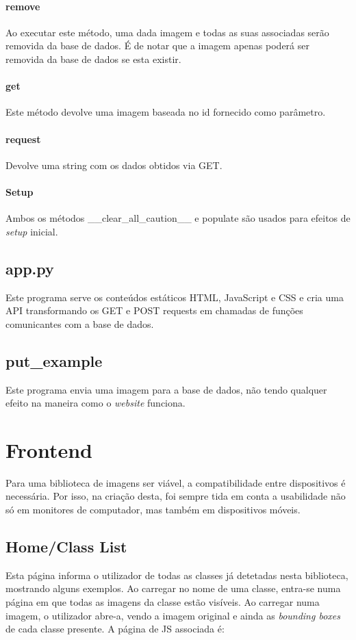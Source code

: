 \documentclass{report}
\begin{document}
\paragraph{remove}
Ao executar este método, uma dada imagem e todas as suas associadas serão removida da base de dados. É de notar que a imagem apenas poderá ser removida da base de dados se esta existir.

\paragraph{get}
Este método devolve uma imagem baseada no id fornecido como parâmetro. 

\paragraph{request}
Devolve uma string com os dados obtidos via GET.

\paragraph{Setup}
Ambos os métodos \_\_clear\_all\_caution\_\_ e  populate são usados para efeitos de \textit{setup} inicial.

\subsection{app.py}
Este programa serve os conteúdos estáticos HTML, JavaScript e CSS e cria uma API transformando os GET e POST requests em chamadas de funções comunicantes com a base de dados. 

\subsection{put\_example}
Este programa envia uma imagem para a base de dados, não tendo qualquer efeito na maneira como o \textit{website} funciona.

\section{Frontend}
Para uma biblioteca de imagens ser viável, a compatibilidade entre dispositivos é necessária. Por isso, na criação desta, foi sempre tida em conta a usabilidade não só em monitores de computador, mas também em dispositivos móveis. 

\subsection{Home/Class List}
Esta página informa o utilizador de todas as classes já detetadas nesta biblioteca, mostrando alguns exemplos. Ao carregar no nome de uma classe, entra-se numa página em que todas as imagens da classe estão visíveis. Ao carregar numa imagem, o utilizador abre-a, vendo a imagem original e ainda as \textit{bounding boxes} de cada classe presente. A página de JS associada é:
\end{document}

